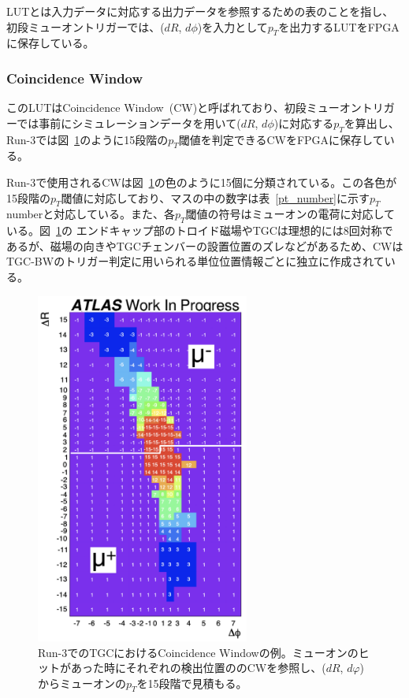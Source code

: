 LUTとは入力データに対応する出力データを参照するための表のことを指し、初段ミューオントリガーでは、($dR$, $d\phi$)を入力として$p_T$を出力するLUTをFPGAに保存している。

\subsubsection{Coincidence Window}
このLUTはCoincidence Window~(CW)と呼ばれており、初段ミューオントリガーでは事前にシミュレーションデータを用いて($dR$, $d\phi$)に対応する$p_T$を算出し、Run-3では図~\ref{fig:CW}のように15段階の$p_T$閾値を判定できるCWをFPGAに保存している。

Run-3で使用されるCWは図~\ref{fig:CW}の色のように15個に分類されている。この各色が15段階の$p_T$閾値に対応しており、マスの中の数字は表~\ref{pt_number}に示す$p_T$ numberと対応している。また、各$p_T$閾値の符号はミューオンの電荷に対応している。図~\ref{fig:CW}の
エンドキャップ部のトロイド磁場やTGCは理想的には8回対称であるが、磁場の向きやTGCチェンバーの設置位置のズレなどがあるため、CWはTGC-BWのトリガー判定に用いられる単位位置情報ごとに独立に作成されている。

\begin{figure}[tb]
  \centering
  \includegraphics[clip, width=7cm]{fig/3/cw_run3_shiomi.png}
  \caption{Run-3でのTGCにおけるCoincidence Windowの例\cite{article:shiomi-mron}。ミューオンのヒットがあった時にそれぞれの検出位置ののCWを参照し、($dR$, $dφ$)からミューオンの$p_T$を15段階で見積もる。}
  \label{fig:CW}
\end{figure}

